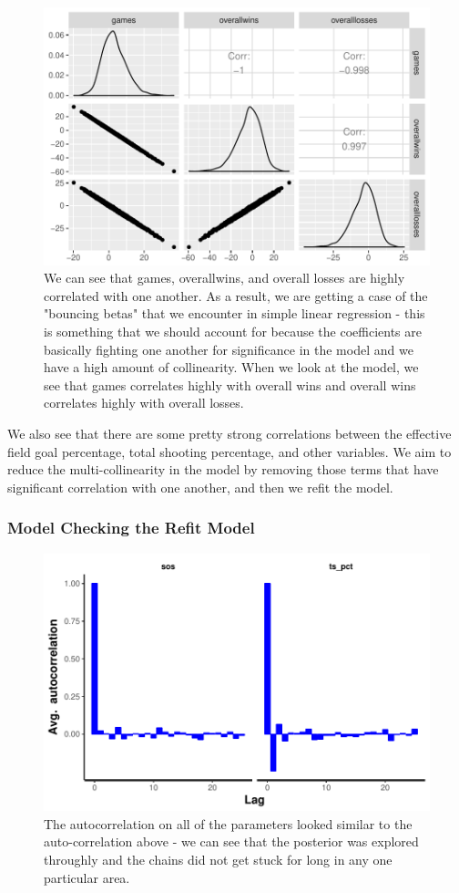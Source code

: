 \documentclass[10pt,a4paper, hidelinks]{article} %
\begin{document}
\begin{figure}[H]
	\centering
	\includegraphics[width=0.7\linewidth]{../fig/polr_correlation}
	\caption{We can see that games, overallwins, and overall losses are highly correlated with one another. As a result, we are getting a case of the "bouncing betas" that we encounter in simple linear regression - this is something that we should account for because the coefficients are basically fighting one another for significance in the model and we have a high amount of collinearity. When we look at the model, we see that games correlates highly with overall wins and overall wins correlates highly with overall losses.}
	\label{fig:polrcorrelation}
\end{figure}

We also see that there are some pretty strong correlations between the effective field goal percentage, total shooting percentage, and other variables. We aim to reduce the multi-collinearity in the model by removing those terms that have significant correlation with one another, and then we refit the model. 

\subsubsection{Model Checking the Refit Model}
\begin{figure}[H]
	\centering
	\includegraphics[width=.6\linewidth]{../fig/polr_autocorr}
	\caption{The autocorrelation on all of the parameters looked similar to the auto-correlation above - we can see that the posterior was explored throughly and the chains did not get stuck for long in any one particular area. }
	\label{fig:polr_autocorrelation}
\end{figure}
\end{document}
